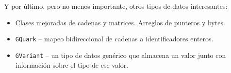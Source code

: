 Y por último, pero no menos importante, otros tipos de datos interesantes:
\begin{itemize}
    \item Clases mejoradas de cadenas y matrices. Arreglos de punteros y bytes.
    \item \lstinline{GQuark} -- mapeo bidireccional de cadenas a identificadores enteros.
    \item \lstinline{GVariant} -- un tipo de datos genérico que almacena un valor junto con información sobre el tipo de ese valor.
\end{itemize}